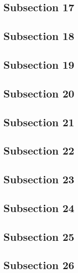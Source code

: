 \documentclass[a4paper, 11pt]{article}
\numberwithin{equation}{subsection}
\begin{document}
\subsection{Subsection 17}

\subsection{Subsection 18}

\subsection{Subsection 19}

\subsection{Subsection 20}

\subsection{Subsection 21}

\subsection{Subsection 22}

\subsection{Subsection 23}

\subsection{Subsection 24}

\subsection{Subsection 25}

\subsection{Subsection 26}

\end{document}
